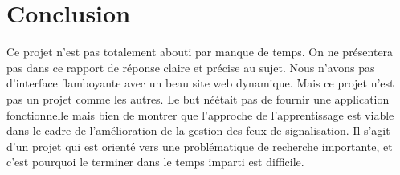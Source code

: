 \documentclass[11pt]{article}
\begin{document}
\section{Conclusion}
Ce projet n'est pas totalement abouti par manque de temps. On ne présentera pas dans ce rapport de réponse claire et précise au sujet. Nous n'avons pas d'interface flamboyante avec un beau site web dynamique. Mais ce projet n'est pas un projet comme les autres. Le but néétait pas de fournir une application fonctionnelle mais bien de montrer que l'approche de l'apprentissage est viable dans le cadre de l'amélioration de la gestion des feux de signalisation. Il s'agit d'un projet qui est orienté vers une problématique de recherche importante, et c'est pourquoi le terminer dans le temps imparti est difficile.
\end{document}
